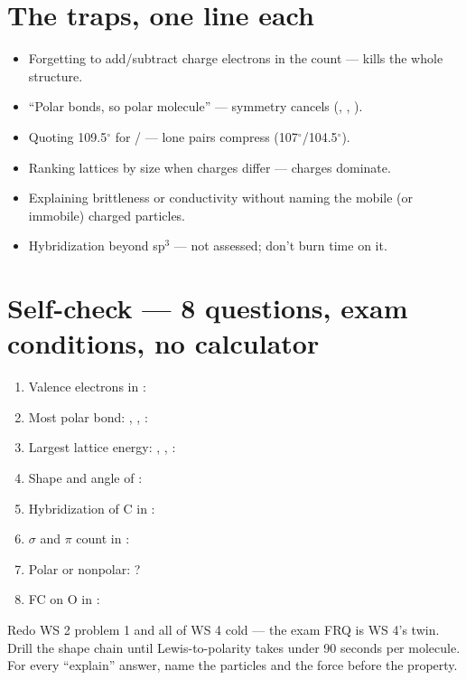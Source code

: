 \documentclass{apchem-worksheet}
\begin{document}
\section*{\sffamily The traps, one line each}

\begin{itemize}[leftmargin=*,itemsep=0.25em]
  \item Forgetting to add/subtract charge electrons in the count --- kills
        the whole structure.
  \item ``Polar bonds, so polar molecule'' --- symmetry cancels
        (, , ).
  \item Quoting 109.5$^\circ$ for / --- lone pairs compress
        (107$^\circ$/104.5$^\circ$).
  \item Ranking lattices by size when charges differ --- charges dominate.
  \item Explaining brittleness or conductivity without naming the mobile (or
        immobile) charged particles.
  \item Hybridization beyond sp$^3$ --- not assessed; don't burn time on it.
\end{itemize}

\section*{\sffamily Self-check --- 8 questions, exam conditions, no calculator}

\begin{enumerate}[leftmargin=*,itemsep=0.45em]
  \item Valence electrons in : 
  \item Most polar bond: , , :
  \item Largest lattice energy: , , :
  \item Shape and angle of : 
  \item Hybridization of C in : 
  \item $\sigma$ and $\pi$ count in : 
  \item Polar or nonpolar: ? 
  \item FC on O in : 
\end{enumerate}

\begin{apcnote}
Redo WS 2 problem 1 and all of WS 4 cold --- the exam FRQ is WS 4's twin.
Drill the shape chain until Lewis-to-polarity takes under 90 seconds per
molecule. For every ``explain'' answer, name the particles and the force
before the property.
\end{apcnote}
\end{document}
